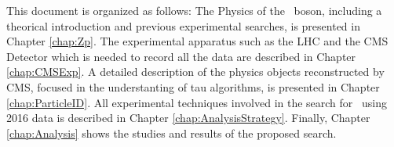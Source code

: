 This document is organized as follows: The Physics of the \Zprime~boson, including a theorical introduction
and previous experimental searches, is presented in Chapter \ref{chap:Zp}. The experimental apparatus such as the LHC and the CMS Detector 
which is needed to record all the data are described in Chapter \ref{chap:CMSExp}. A detailed description of the physics objects reconstructed 
by CMS, focused in the understanting of tau algorithms, is presented in Chapter \ref{chap:ParticleID}. All experimental techniques  
involved in the search for \Zprime~using 2016 data is described in Chapter \ref{chap:AnalysisStrategy}. Finally, Chapter \ref{chap:Analysis} shows 
the studies and results of the proposed search.

